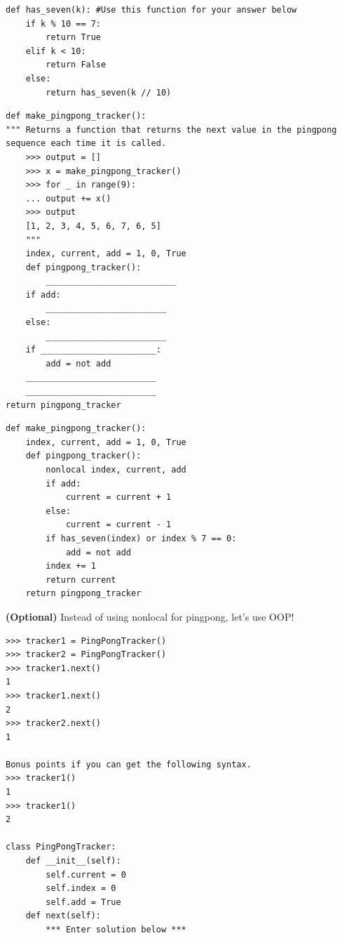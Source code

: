 \documentclass{exam}
\begin{document}
\begin{questions}
\begin{blocksection}
\begin{lstlisting}
def has_seven(k): #Use this function for your answer below
    if k % 10 == 7:
        return True
    elif k < 10:
        return False
    else:
        return has_seven(k // 10)
\end{lstlisting}
\end{blocksection}

\begin{blocksection}
\begin{lstlisting}
def make_pingpong_tracker():
""" Returns a function that returns the next value in the pingpong sequence each time it is called. 
	>>> output = []
	>>> x = make_pingpong_tracker()
	>>> for _ in range(9):
	...	output += x()
	>>> output
	[1, 2, 3, 4, 5, 6, 7, 6, 5]
	"""
	index, current, add = 1, 0, True
	def pingpong_tracker():
		__________________________
	if add:
		________________________
	else:
		________________________
	if _______________________:
		add = not add
	__________________________
	__________________________	
return pingpong_tracker

\end{lstlisting}

\begin{solution}
\begin{lstlisting}
def make_pingpong_tracker():
	index, current, add = 1, 0, True
	def pingpong_tracker():
		nonlocal index, current, add
		if add:
			current = current + 1
		else:
			current = current - 1
		if has_seven(index) or index % 7 == 0:
			add = not add
		index += 1
		return current
	return pingpong_tracker
\end{lstlisting}
\end{solution}

\end{blocksection}

\begin{blocksection}
\question \textbf{(Optional)} Instead of using nonlocal for pingpong, let's use OOP!

\begin{lstlisting}
>>> tracker1 = PingPongTracker()
>>> tracker2 = PingPongTracker()
>>> tracker1.next()
1
>>> tracker1.next()
2
>>> tracker2.next()
1

Bonus points if you can get the following syntax.
>>> tracker1()
1
>>> tracker1()
2

class PingPongTracker:
    def __init__(self):
        self.current = 0
        self.index = 0
        self.add = True
    def next(self):
        *** Enter solution below ***
\end{lstlisting}
\end{blocksection}


\end{questions}
\end{document}
